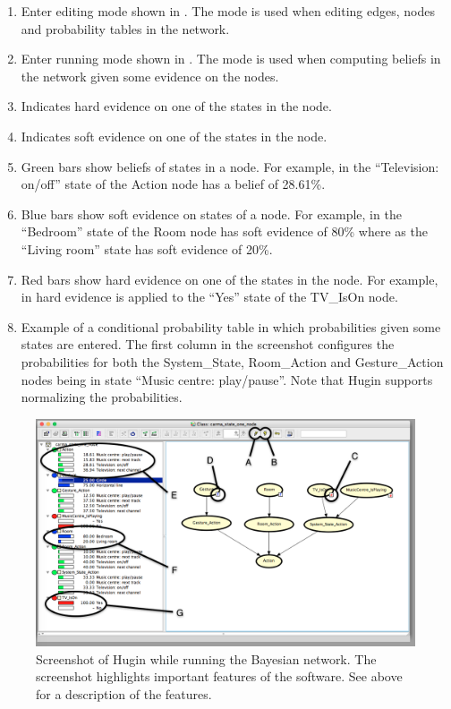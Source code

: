 \begin{enumerate}[label=\Alph*.]
\item Enter editing mode shown in . The mode is used when editing edges, nodes and probability tables in the network.
\item Enter running mode shown in . The mode is used when computing beliefs in the network given some evidence on the nodes.
\item Indicates hard evidence on one of the states in the node.
\item Indicates soft evidence on one of the states in the node.
\item Green bars show beliefs of states in a node. For example, in  the ``Television: on/off'' state of the Action node has a belief of 28.61\%.
\item Blue bars show soft evidence on states of a node. For example, in  the ``Bedroom'' state of the Room node has soft evidence of 80\% where as the ``Living room'' state has soft evidence of 20\%.
\item Red bars show hard evidence on one of the states in the node. For example, in  hard evidence is applied to the ``Yes'' state of the TV\_IsOn node.
\item Example of a conditional probability table in which probabilities given some states are entered. The first column in the screenshot configures the probabilities for both the System\_State, Room\_Action and Gesture\_Action nodes being in state ``Music centre: play/pause''. Note that Hugin supports normalizing the probabilities.
\end{enumerate}

\begin{figure}[h!]
\centering
\includegraphics[width=\textwidth]{images/hugin-functionality-running}
\caption{Screenshot of Hugin while running the Bayesian network. The screenshot highlights important features of the software. See above for a description of the features.}
\label{fig:design:bayesian-network:hugin-functionality-running}
\end{figure}

